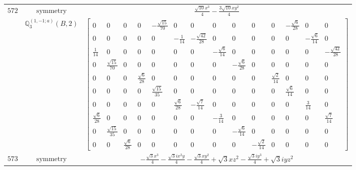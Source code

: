 \documentclass[fleqn,8pt,landscape]{jsarticle}
\begin{document}
\begin{longtable}{ccc}
$ 572 $ & $ \text{symmetry} $ & $ \frac{\sqrt{10} x^{3}}{4} - \frac{3 \sqrt{10} x y^{2}}{4} $ \\
$  $ & $ \mathbb{Q}_{3}^{(1,-1;a)}(B,2) $ & $ \begin{bmatrix} 0 & 0 & 0 & 0 & - \frac{\sqrt{15}}{70} & 0 & 0 & 0 & 0 & 0 & 0 & - \frac{\sqrt{6}}{28} & 0 & 0 \\ 0 & 0 & 0 & 0 & 0 & - \frac{1}{14} & - \frac{\sqrt{42}}{28} & 0 & 0 & 0 & 0 & 0 & - \frac{\sqrt{6}}{14} & 0 \\ \frac{1}{14} & 0 & 0 & 0 & 0 & 0 & 0 & - \frac{\sqrt{6}}{14} & 0 & 0 & 0 & 0 & 0 & - \frac{\sqrt{42}}{28} \\ 0 & \frac{\sqrt{15}}{70} & 0 & 0 & 0 & 0 & 0 & 0 & - \frac{\sqrt{6}}{28} & 0 & 0 & 0 & 0 & 0 \\ 0 & 0 & 0 & \frac{\sqrt{6}}{28} & 0 & 0 & 0 & 0 & 0 & 0 & \frac{\sqrt{2}}{14} & 0 & 0 & 0 \\ 0 & 0 & 0 & 0 & \frac{\sqrt{15}}{35} & 0 & 0 & 0 & 0 & 0 & 0 & \frac{\sqrt{6}}{14} & 0 & 0 \\ 0 & 0 & 0 & 0 & 0 & \frac{\sqrt{6}}{28} & - \frac{\sqrt{7}}{14} & 0 & 0 & 0 & 0 & 0 & \frac{3}{14} & 0 \\ \frac{\sqrt{6}}{28} & 0 & 0 & 0 & 0 & 0 & 0 & - \frac{3}{14} & 0 & 0 & 0 & 0 & 0 & \frac{\sqrt{7}}{14} \\ 0 & \frac{\sqrt{15}}{35} & 0 & 0 & 0 & 0 & 0 & 0 & - \frac{\sqrt{6}}{14} & 0 & 0 & 0 & 0 & 0 \\ 0 & 0 & \frac{\sqrt{6}}{28} & 0 & 0 & 0 & 0 & 0 & 0 & - \frac{\sqrt{2}}{14} & 0 & 0 & 0 & 0 \end{bmatrix} $ \\ \hline
$ 573 $ & $ \text{symmetry} $ & $ - \frac{\sqrt{3} x^{3}}{4} - \frac{\sqrt{3} i x^{2} y}{4} - \frac{\sqrt{3} x y^{2}}{4} + \sqrt{3} x z^{2} - \frac{\sqrt{3} i y^{3}}{4} + \sqrt{3} i y z^{2} $ \\

\end{longtable}
\end{document}
